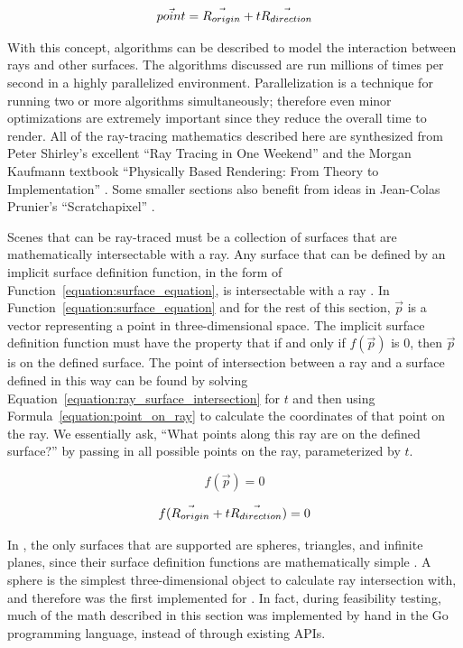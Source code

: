\begin{equation}
  \label{equation:point_on_ray}
  \vec{point} = \vec{R_{origin}} + t\vec{R_{direction}}
\end{equation}

With this concept, algorithms can be described to model the interaction between rays and other surfaces.
The algorithms discussed are run millions of times per second in a highly parallelized environment.
Parallelization is a technique for running two or more algorithms simultaneously; therefore even minor optimizations are extremely important since they reduce the overall time to render.
All of the ray-tracing mathematics described here are synthesized from Peter Shirley's excellent ``Ray Tracing in One Weekend'' \cite{shirley2016ray} and the Morgan Kaufmann textbook ``Physically Based Rendering: From Theory to Implementation'' \cite{pharr2016physically}.
Some smaller sections also benefit from ideas in Jean-Colas Prunier's ``Scratchapixel'' \cite{prunier2017triangle}.

Scenes that can be ray-traced must be a collection of surfaces that are mathematically intersectable with a ray.
Any surface that can be defined by an implicit surface definition function, in the form of Function~\ref{equation:surface_equation}, is intersectable with a ray \cite{pharr2016physically}.
In Function~\ref{equation:surface_equation} and for the rest of this section, $\vec{p}$ is a vector representing a point in three-dimensional space.
The implicit surface definition function must have the property that if and only if $f(\vec{p})$ is $0$, then $\vec{p}$ is on the defined surface.
The point of intersection between a ray and a surface defined in this way can be found by solving Equation~\ref{equation:ray_surface_intersection} for $t$ and then using Formula~\ref{equation:point_on_ray} to calculate the coordinates of that point on the ray.
We essentially ask, ``What points along this ray are on the defined surface?'' by passing in all possible points on the ray, parameterized by $t$.

\begin{equation}
  \label{equation:surface_equation}
  f(\vec{p}) = 0
\end{equation}

\begin{equation}
  \label{equation:ray_surface_intersection}
  f(\vec{R_{origin}} + t\vec{R_{direction}}) = 0
\end{equation}

In \name, the only surfaces that are supported are spheres, triangles, and infinite planes, since their surface definition functions are mathematically simple .
A sphere is the simplest three-dimensional object to calculate ray intersection with, and therefore was the first implemented for \name.
In fact, during feasibility testing, much of the math described in this section was implemented by hand in the Go programming language, instead of through existing APIs.

